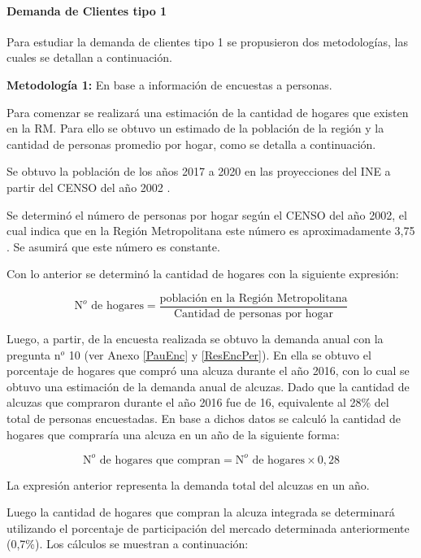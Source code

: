 \paragraph{Demanda de Clientes tipo 1}

Para estudiar la demanda de clientes tipo 1 se propusieron dos metodologías, las cuales se detallan a continuación.

\textbf{Metodología 1:}  En base a información de encuestas a personas.

Para comenzar se realizará una estimación de la cantidad de hogares que existen en la RM.  Para ello se obtuvo un estimado de la población de la región y la cantidad de personas promedio por hogar, como se detalla a continuación.


Se obtuvo la población de los años 2017 a 2020 en las proyecciones del INE a partir del CENSO del año 2002  \cite{ine1}.

Se determinó el número de personas por hogar  según el CENSO del año 2002, el cual indica que en la Región Metropolitana este número es aproximadamente 3,75 \cite{ine2}. Se asumirá que este número es constante.

Con lo anterior se determinó la cantidad de hogares con la siguiente expresión:

\begin{equation*}
\mbox{N}^o\text{ de hogares} = \frac{\text{población en la Región Metropolitana}}{\text{Cantidad de personas por hogar}}
\end{equation*}

Luego, a partir, de la encuesta realizada se obtuvo la demanda anual con la pregunta n$^o$ 10 (ver Anexo \ref{PauEnc} y \ref{ResEncPer}). En ella se obtuvo el porcentaje de hogares que compró una alcuza durante el año 2016, con lo cual se obtuvo una estimación de la demanda anual de alcuzas. Dado que la cantidad de alcuzas que compraron durante el año 2016 fue de 16, equivalente al 28\% del total de personas encuestadas. En base a dichos datos se calculó la cantidad de hogares que compraría una alcuza en un año de la siguiente forma:


\begin{equation*}
\mbox{N}^o\mbox{ de hogares que compran} = \mbox{N}^o\mbox{ de hogares}\times 0,28
\end{equation*}

La expresión anterior representa la demanda total del alcuzas en un año.

Luego la cantidad de hogares que compran la alcuza integrada se determinará utilizando el porcentaje de participación del mercado determinada anteriormente (0,7\%). Los cálculos se muestran a continuación:

